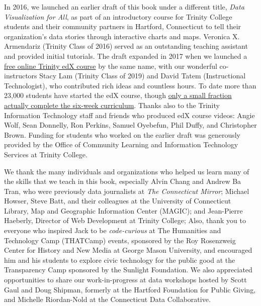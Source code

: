 \documentclass[
  english,
]{book}
\begin{document}
In 2016, we launched an earlier draft of this book under a different title, \emph{Data Visualization for All}, as part of an introductory course for Trinity College students and their community partners in Hartford, Connecticut to tell their organization's data stories through interactive charts and maps. Veronica X. Armendariz (Trinity Class of 2016) served as an outstanding teaching assistant and provided initial tutorials. The draft expanded in 2017 when we launched a \href{https://www.edx.org/course/data-visualization-for-all}{free online Trinity edX course} by the same name, with our wonderful co-instructors Stacy Lam (Trinity Class of 2019) and David Tatem (Instructional Technologist), who contributed rich ideas and countless hours. To date more than 23,000 students have started the edX course, though \href{https://jackdougherty.org/2017/11/21/tough-questions-to-ask-about-trinity-edx/}{only a small fraction actually complete the six-week curriculum}. Thanks also to the Trinity Information Technology staff and friends who produced edX course videos: Angie Wolf, Sean Donnelly, Ron Perkins, Samuel Oyebefun, Phil Duffy, and Christopher Brown. Funding for students who worked on the earlier draft was generously provided by the Office of Community Learning and Information Technology Services at Trinity College.

We thank the many individuals and organizations who helped us learn many of the skills that we teach in this book, especially Alvin Chang and Andrew Ba Tran, who were previously data journalists at \emph{The Connecticut Mirror}; Michael Howser, Steve Batt, and their colleagues at the University of Connecticut Library, Map and Geographic Information Center (MAGIC); and Jean-Pierre Haeberly, Director of Web Development at Trinity College; Also, thank you to everyone who inspired Jack to be \emph{code-curious} at The Humanities and Technology Camp (THATCamp) events, sponsored by the Roy Rosenzweig Center for History and New Media at George Mason University, and encouraged him and his students to explore civic technology for the public good at the Transparency Camp sponsored by the Sunlight Foundation. We also appreciated opportunities to share our work-in-progress at data workshops hosted by Scott Gaul and Doug Shipman, formerly at the Hartford Foundation for Public Giving, and Michelle Riordan-Nold at the Connecticut Data Collaborative.
\end{document}
